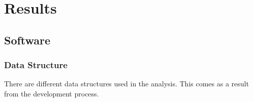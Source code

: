 \chapter{Results}
\label{results_chapter}

\section{Software}
\subsection{Data Structure}
There are different data structures used in the analysis. This comes as a result from the development process.

